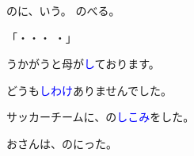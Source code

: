 \documentclass{minimal}
\begin{document}
\noindent
{}のに、いう。
のべる。

\noindent
「・・・
・」

\vspace{55pt}

\noindent
{}うかがうと母が\textcolor{blue}{し}ております。

\noindent
どうも\textcolor{blue}{しわけ}ありませんでした。

\noindent
サッカーチームに、の\textcolor{blue}{しこみ}をした。

\noindent
おさんは、の\textcolor{blue}{}にった。
\end{document}

